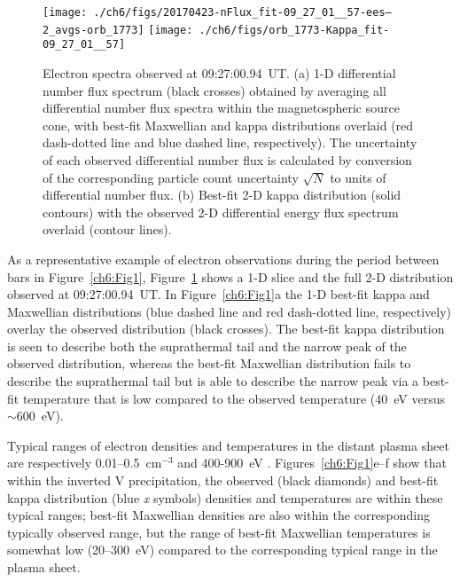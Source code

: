 
  \begin{figure}
    \centering
    \noindent\texttt{[image: ./ch6/figs/20170423-nFlux\_fit-09\_27\_01\_\_57-ees--2\_avgs-orb\_1773]}
    \noindent\texttt{[image: ./ch6/figs/orb\_1773-Kappa\_fit-09\_27\_01\_\_57]}
    \caption[Example of one- and two-dimensional fits of observed inverted-V
    electron distributions (Orbit 1773)]{Electron spectra observed at
      09:27:00.94~UT. (a) 1-D differential number flux spectrum (black crosses)
      obtained by averaging all differential number flux spectra within the
      magnetospheric source cone, with best-fit Maxwellian and kappa
      distributions overlaid (red dash-dotted line and blue dashed line,
      respectively). The uncertainty of each observed differential number flux
      is calculated by conversion of the corresponding particle count
      uncertainty $\sqrt{N}$ to units of differential number flux. (b) Best-fit
      2-D kappa distribution (solid contours) with the observed 2-D differential
      energy flux spectrum overlaid (contour lines). }
    \label{ch6:Fig2}
  \end{figure}


  As a representative example of electron observations during the period between
  bars in Figure~\ref{ch6:Fig1}, Figure~\ref{ch6:Fig2} shows a 1-D slice and the
  full 2-D distribution observed at 09:27:00.94~UT.  In Figure~\ref{ch6:Fig1}a
  the 1-D best-fit kappa and Maxwellian distributions (blue dashed line and red
  dash-dotted line, respectively) overlay the observed distribution (black
  crosses). The best-fit kappa distribution is seen to describe both the
  suprathermal tail and the narrow peak of the observed distribution, whereas
  the best-fit Maxwellian distribution fails to describe the suprathermal tail
  but is able to describe the narrow peak via a best-fit temperature that is low
  compared to the observed temperature (40~eV versus $\sim$600~eV).

  Typical ranges of electron densities and temperatures in the distant plasma
  sheet are respectively 0.01--0.5~cm$^{-3}$ and 400-900~eV
  \citep{Kletzing2003,Paschmann2003}. Figures~\ref{ch6:Fig1}e--f show that
  within the inverted V precipitation, the observed (black diamonds) and
  best-fit kappa distribution (blue \emph{x} symbols) densities and temperatures
  are within these typical ranges; best-fit Maxwellian densities are also within
  the corresponding typically observed range, but the range of best-fit
  Maxwellian temperatures is somewhat low (20--300~eV) compared to the
  corresponding typical range in the plasma sheet.


